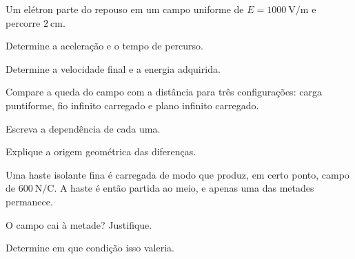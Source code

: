 \begin{questao}[3]{}

Um elétron parte do repouso em um campo uniforme de
$E=\SI{1000}{\volt\per\meter}$ e percorre $\SI{2}{\centi\meter}$.
\begin{itensq}
\item Determine a aceleração e o tempo de percurso.
\item Determine a velocidade final e a energia adquirida.
\end{itensq}


\end{questao}
\begin{questao}[3]{}

Compare a queda do campo com a distância para três configurações: carga
puntiforme, fio infinito carregado e plano infinito carregado.
\begin{itensq}
\item Escreva a dependência de cada uma.
\item Explique a origem geométrica das diferenças.
\end{itensq}


\end{questao}
\begin{questao}[3]{}

Uma haste isolante fina é carregada de modo que produz, em certo ponto, campo
de $\SI{600}{\newton\per\coulomb}$. A haste é então partida ao meio, e apenas
uma das metades permanece.
\begin{itensq}
\item O campo cai à metade? Justifique.
\item Determine em que condição isso valeria.
\end{itensq}


\end{questao}


